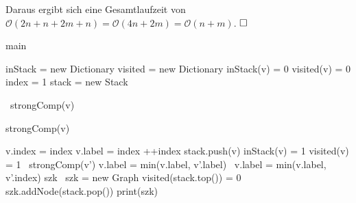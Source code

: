 \documentclass[12pt]{scrartcl}%
\theoremstyle{nonumberplain}
\newcommand{\bO}[1]{\mathcal O(#1)}
\begin{document}
Daraus ergibt sich eine Gesamtlaufzeit von $\bO{2n + n + 2m + n} = \bO{4n + 2m} = \bO{n+m}$.
$\hfill\square$

\begin{algorithm}
	\caption{main}	
	
	\BlankLine
	
	inStack = new Dictionary\;
	visited = new Dictionary\;
	 {
		inStack(v) = 0\;
		visited(v) = 0\;	
	}
	index = 1\;
	stack = new Stack\;
	
	 {
		 {\
			strongComp(v)\;
		}
	}
\end{algorithm}

\begin{algorithm}
	\caption{strongComp(v)}
	
	v.index = index\;
	v.label = index\;
	++index\;
	stack.push(v)\;
	inStack(v) = 1\;
	visited(v) = 1\;
	 {
		 {\
			strongComp(v')\;
			v.label = min(v.label, v'.label)\;	
		}  {\
			v.label = min(v.label, v'.index)\;
		}
	}
	szk\;
	 {\
		szk = new Graph\;
		 {
			visited(stack.top()) = 0\;
			szk.addNode(stack.pop())\;
		}
		print(szk)\;
	}
\end{algorithm}
\end{document}
